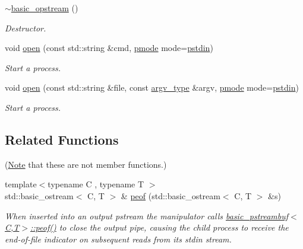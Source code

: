 \begin{DoxyCompactItemize}
\mbox{\hyperlink{classredi_1_1basic__opstream_ab66a34987ca0dd5b1a60e21ac9b396d0}{$\sim$basic\+\_\+opstream}} ()
\begin{DoxyCompactList}\small\item\em Destructor. \end{DoxyCompactList}\item 
void \mbox{\hyperlink{classredi_1_1basic__opstream_ad7a0f17e3b135712a40f55868aaee1f6}{open}} (const std\+::string \&cmd, \mbox{\hyperlink{structredi_1_1pstreams_a1eae4aad88812af03a0fbb3ec13c50b7}{pmode}} mode=\mbox{\hyperlink{structredi_1_1pstreams_a7a976ce992db857f86a0cc3352e42d3a}{pstdin}})
\begin{DoxyCompactList}\small\item\em Start a process. \end{DoxyCompactList}\item 
void \mbox{\hyperlink{classredi_1_1basic__opstream_a0e19af861168cde3fc595c47b81ca47a}{open}} (const std\+::string \&file, const \mbox{\hyperlink{structredi_1_1pstreams_af902b894b095c1875e96c10129489467}{argv\+\_\+type}} \&argv, \mbox{\hyperlink{structredi_1_1pstreams_a1eae4aad88812af03a0fbb3ec13c50b7}{pmode}} mode=\mbox{\hyperlink{structredi_1_1pstreams_a7a976ce992db857f86a0cc3352e42d3a}{pstdin}})
\begin{DoxyCompactList}\small\item\em Start a process. \end{DoxyCompactList}\end{DoxyCompactItemize}
\subsection*{Related Functions}
(\mbox{\hyperlink{classNote}{Note}} that these are not member functions.) \begin{DoxyCompactItemize}
\item 
{\footnotesize template$<$typename C , typename T $>$ }\\std\+::basic\+\_\+ostream$<$ C, T $>$ \& \mbox{\hyperlink{classredi_1_1basic__opstream_ae478e003f69d83bfcc8121f5f16f538d}{peof}} (std\+::basic\+\_\+ostream$<$ C, T $>$ \&s)
\begin{DoxyCompactList}\small\item\em When inserted into an output pstream the manipulator calls \mbox{\hyperlink{classredi_1_1basic__pstreambuf_a6937e84719c4eaf08f2a2e514ff98e93}{basic\+\_\+pstreambuf$<$\+C,\+T$>$\+::peof()}} to close the output pipe, causing the child process to receive the end-\/of-\/file indicator on subsequent reads from its {\ttfamily stdin} stream. \end{DoxyCompactList}\end{DoxyCompactItemize}
